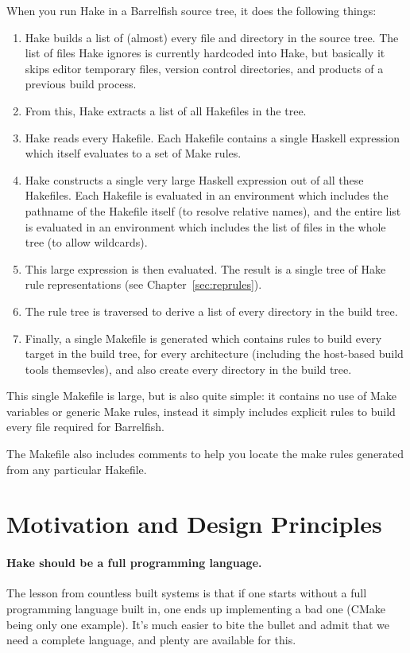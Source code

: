 \documentclass[a4paper,twoside]{report} %
\begin{document}
When you run Hake in a Barrelfish source tree, it does the following things:
\begin{enumerate}
\item Hake builds a list of (almost) every file and directory in the
  source tree.  The list of files Hake ignores is currently hardcoded
  into Hake, but basically it skips editor temporary files, version
  control directories, and products of a previous build process. 
\item From this, Hake extracts a list of all Hakefiles in the tree. 
\item Hake reads every Hakefile.  Each Hakefile contains a single
  Haskell expression which itself evaluates to a set of Make rules. 
\item Hake constructs a single very large Haskell expression out of
  all these Hakefiles.  Each Hakefile is evaluated in an environment
  which includes the pathname of the Hakefile itself (to resolve
  relative names), and the entire list is evaluated in an environment
  which includes the list of files in the whole tree (to allow
  wildcards). 
\item This large expression is then evaluated.  The result is a single
  tree of Hake rule representations (see
  Chapter~\ref{sec:reprules}). 
\item The rule tree is traversed to derive a list of every directory
  in the build tree.  
\item Finally, a single Makefile is generated which contains rules to
  build every target in the build tree, for every architecture
  (including the host-based build tools themsevles), and also create
  every directory in the build tree. 
\end{enumerate}

This single Makefile is large, but is also quite simple: it contains
no use of Make variables or generic Make rules, instead it simply
includes explicit rules to build every file required for Barrelfish. 

The Makefile also includes comments to help you locate the make rules
generated from any particular Hakefile. 

\section{Motivation and Design Principles}

\paragraph{Hake should be a full programming language.}  The lesson
from countless built systems is that if one starts without a full
programming language built in, one ends up implementing a bad one
(CMake being only one example).  It's much easier to bite the bullet
and admit that we need a complete language, and plenty are available
for this. 
\end{document}
